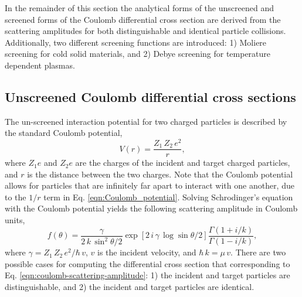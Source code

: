 In the remainder of this section the analytical forms of the unscreened and screened forms of the Coulomb differential cross section are derived from the scattering amplitudes for both distinguishable and identical particle collisions. Additionally, two different screening functions are introduced: 1) Moliere screening for cold solid materials, and 2) Debye screening for temperature dependent plasmas.

\subsection{Unscreened Coulomb differential cross sections}
The un-screened interaction potential for two charged particles is described by the standard Coulomb potential,
\begin{equation} \label{eqn:Coulomb_potential}
    V(r) = \dfrac{Z_1 \, Z_2 \, e^2}{r},
\end{equation}
where $Z_1 e$ and $Z_2 e$ are the charges of the incident and target charged particles, and $r$ is the distance between the two charges. Note that the Coulomb potential allows for particles that are infinitely far apart to interact with one another, due to the $1/r$ term in Eq. \eqref{eqn:Coulomb_potential}. Solving Schrodinger's equation with the Coulomb potential yields the following scattering amplitude in Coulomb units,
\begin{equation} \label{eqn:coulomb-scattering-amplitude}
    f(\theta) = \dfrac{\gamma}{2 \, k \, \sin^2 \theta/2} \exp \left[ 2 \, i \, \gamma \, \log \sin \theta/2 \right] \dfrac{\Gamma(1 + i/k)}{\Gamma(1 - i/k)},
\end{equation}
where $\gamma = Z_1 \, Z_2 \, e^2 / \hbar \, v$, $v$ is the incident velocity, and $\hbar \, k = \mu \, v$. There are two possible cases for computing the differential cross section that corresponding to Eq. \eqref{eqn:coulomb-scattering-amplitude}: 1) the incident and target particles are distinguishable, and 2) the incident and target particles are identical. 

